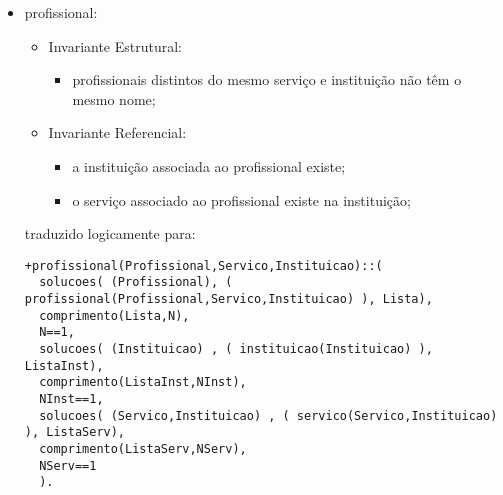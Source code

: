 \documentclass[
  oneside,
  10pt, a4paper,
  footinclude=true,
  headinclude=true,
  cleardoublepage=empty
]{scrbook}
\begin{document}
\begin{itemize}
\item   profissional:
\begin{itemize}
\item        Invariante Estrutural:
\begin{itemize}
\item         profissionais distintos do mesmo serviço e instituição não têm o mesmo nome;
\end{itemize}
\item        Invariante Referencial:
\begin{itemize}
\item         a instituição associada ao profissional existe;
\item         o serviço associado ao profissional existe na instituição;
\end{itemize}
\end{itemize}
traduzido logicamente para:
\begin{lstlisting}
+profissional(Profissional,Servico,Instituicao)::(
  solucoes( (Profissional), ( profissional(Profissional,Servico,Instituicao) ), Lista),
  comprimento(Lista,N),
  N==1,
  solucoes( (Instituicao) , ( instituicao(Instituicao) ), ListaInst),
  comprimento(ListaInst,NInst),
  NInst==1,
  solucoes( (Servico,Instituicao) , ( servico(Servico,Instituicao) ), ListaServ),
  comprimento(ListaServ,NServ),
  NServ==1
  ).
\end{lstlisting}


\end{itemize}
\end{document}
